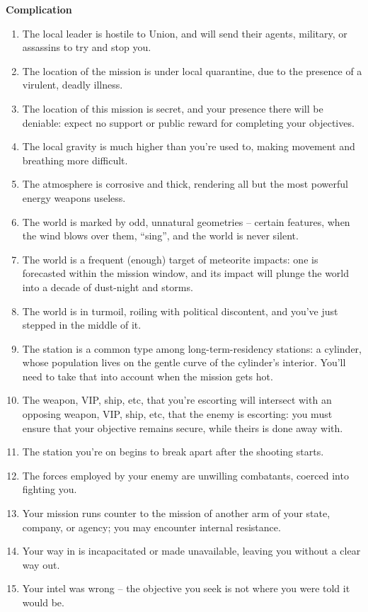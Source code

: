 \textbf{Complication}
    \begin{enumerate}
    \item The local leader is hostile to Union, and will send their agents, military, or assassins to try and stop you.
    \item The location of the mission is under local quarantine, due to the presence of a virulent, deadly illness.
    \item The location of this mission is secret, and your presence there will be deniable: expect no support or public reward for completing your objectives.
    \item The local gravity is much higher than you’re used to, making movement and breathing more difficult.
    \item The atmosphere is corrosive and thick, rendering all but the most powerful energy weapons useless.
    \item The world is marked by odd, unnatural geometries -- certain features, when the wind blows over them, “sing”, and the world is never silent.
    \item The world is a frequent (enough) target of meteorite impacts: one is forecasted within the mission window, and its impact will plunge the world into a decade of dust-night and storms.
    \item The world is in turmoil, roiling with political discontent, and you’ve just stepped in the middle of it.
    \item The station is a common type among long-term-residency stations: a cylinder, whose population lives on the gentle curve of the cylinder’s interior. You’ll need to take that into account when the mission gets hot.
    \item The weapon, VIP, ship, etc, that you’re escorting will intersect with an opposing weapon, VIP, ship, etc, that the enemy is escorting: you must ensure that your objective remains secure, while theirs is done away with.
    \item The station you’re on begins to break apart after the shooting starts.
    \item The forces employed by your enemy are unwilling combatants, coerced into fighting you.
    \item Your mission runs counter to the mission of another arm of your state, company, or agency; you may encounter internal resistance.
    \item Your way in is incapacitated or made unavailable, leaving you without a clear way out.
    \item Your intel was wrong -- the objective you seek is not where you were told it would be.

\end{enumerate}
